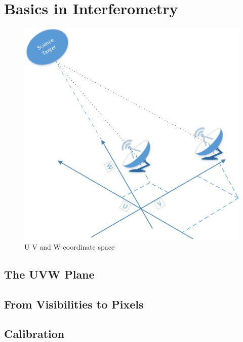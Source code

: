 \section{Basics in Interferometry} \label{radio}

\begin{figure}[h!] \label{radio:uvw}
	\centering
	\includegraphics[width=0.8\linewidth]{./chapters/03.radio/uvw.png}
	\caption{U V and W coordinate space}
\end{figure}
\subsection{The UVW Plane}

\subsection{From Visibilities to Pixels}

\subsection{Calibration}